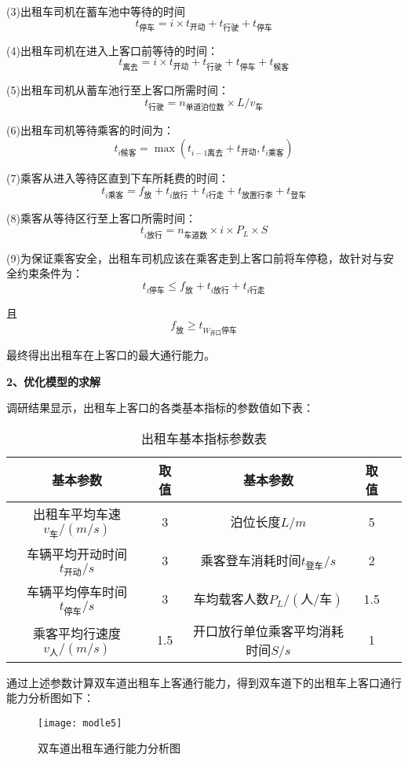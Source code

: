 \documentclass[withoutpreface,bwprint]{cumcmthesis} %
\begin{document}
(3)出租车司机在蓄车池中等待的时间
$$
t_{\text{停车}}=i \times t_{\text{开动}}+t_{\text{行驶}}+t_{\text{停车}}
$$

(4)出租车司机在进入上客口前等待的时间：
$$
t_{\text{离去}}=i \times t_{\text{开动}}+t_{\text{行驶}}+t_{\text{停车}}+t_{\text{候客}}
$$

(5)出租车司机从蓄车池行至上客口所需时间：
$$
t_{\text{行驶}}=n_{\text{单道泊位数}} \times L / v_{\text{车}}
$$

(6)出租车司机等待乘客的时间为：
$$
t_{i \text{候客}}=\max \left(t_{i-1 \text{离去}}+t_{\text{开动}}, t_{i \text{乘客}}\right)
$$

(7)乘客从进入等待区直到下车所耗费的时间：
$$
t_{i {\text{乘客}}}=f_{\text{放}}+t_{i {\text{放行}}}+t_{i {\text{行走}}}+t_{\text{放置行李}}+t_{\text{登车}}
$$

(8)乘客从等待区行至上客口所需时间：
$$
t_{i \text{放行}}=n_{\text{车道数}} \times i \times P_{L} \times S
$$

(9)为保证乘客安全，出租车司机应该在乘客走到上客口前将车停稳，故针对与安全约束条件为：
$$
t_{i \text{停车}} \leq f_{\text{放}}+t_{i \text{放行}}+t_{i \text{行走}}
$$

且
$$
f_{\text{放}} \geqslant t_{{W}_{\text{开口}} \text{停车}}
$$

最终得出出租车在上客口的最大通行能力。

\textbf{2、优化模型的求解}

调研结果显示，出租车上客口的各类基本指标的参数值如下表：
\begin{table}[!htbp]
	\caption{出租车基本指标参数表}\label{tab:008} \centering
	\begin{tabular}{ccccc}
		\toprule[2pt]
		基本参数 & 取值 & 基本参数 & 取值\\
		\midrule[1pt]
		出租车平均车速$v_{\text{车}}/(m/s)$ & 3	& 泊位长度$L/m$ & 5\\
		车辆平均开动时间$t_{\text{开动}}/s$ & 3 & 乘客登车消耗时间$t_{\text{登车}}/s$ & 2\\
	    车辆平均停车时间$t_{\text{停车}}/s$ & 3 &
	    车均载客人数$P_L/({\text{人}}/{\text{车}})$ & 1.5\\
		乘客平均行速度$v_{\text{人}}/(m/s)$ & 1.5 & 开口放行单位乘客平均消耗时间$S/s$ & 1\\
		\bottomrule[1.5pt]
	\end{tabular}
\end{table}
\newpage
通过上述参数计算双车道出租车上客通行能力，得到双车道下的出租车上客口通行能力分析图如下：
\begin{figure}[!htbp]
	\centering
	\texttt{[image: modle5]}
	\caption{双车道出租车通行能力分析图}
	\label{fig:circuit-diagram}
\end{figure}
\end{document}
